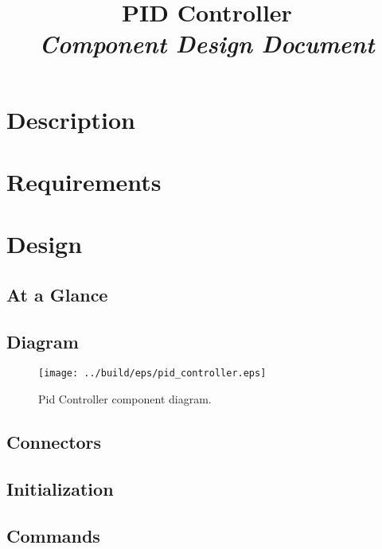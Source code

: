 



\title{\textbf{PID Controller} \\
\large\textit{Component Design Document}}
\date{}
\maketitle

\section{Description}


\section{Requirements}


\section{Design}

\subsection{At a Glance}


\subsection{Diagram}
\begin{figure}[H]
  \texttt{[image: ../build/eps/pid\_controller.eps]}
  \caption{Pid Controller component diagram.}
\end{figure}

\subsection{Connectors}


\subsection{Initialization}


\subsection{Commands}

